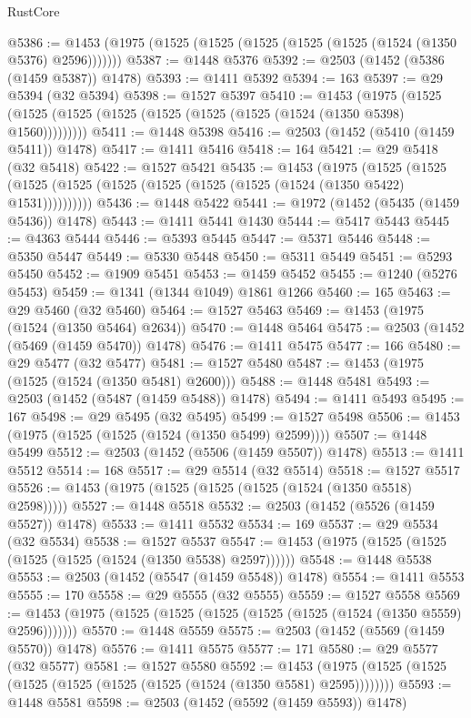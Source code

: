 \begin{lexlean}{RustCore}
\begin{coremodule}
@5386 := @1453 (@1975 (@1525 (@1525 (@1525 (@1525 (@1525 (@1524 (@1350 @5376) @2596)))))))
@5387 := @1448 @5376
@5392 := @2503 (@1452 (@5386 (@1459 @5387)) @1478)
@5393 := @1411 @5392
@5394 := 163
@5397 := @29 @5394 (@32 @5394)
@5398 := @1527 @5397
@5410 := @1453
    (@1975 (@1525 (@1525 (@1525 (@1525 (@1525 (@1525 (@1525 (@1524 (@1350 @5398) @1560)))))))))
@5411 := @1448 @5398
@5416 := @2503 (@1452 (@5410 (@1459 @5411)) @1478)
@5417 := @1411 @5416
@5418 := 164
@5421 := @29 @5418 (@32 @5418)
@5422 := @1527 @5421
@5435 := @1453
    (@1975
      (@1525 (@1525 (@1525 (@1525 (@1525 (@1525 (@1525 (@1525 (@1524 (@1350 @5422) @1531))))))))))
@5436 := @1448 @5422
@5441 := @1972 (@1452 (@5435 (@1459 @5436)) @1478)
@5443 := @1411 @5441 @1430
@5444 := @5417 @5443
@5445 := @4363 @5444
@5446 := @5393 @5445
@5447 := @5371 @5446
@5448 := @5350 @5447
@5449 := @5330 @5448
@5450 := @5311 @5449
@5451 := @5293 @5450
@5452 := @1909 @5451
@5453 := @1459 @5452
@5455 := @1240 (@5276 @5453)
@5459 := @1341 (@1344 @1049) @1861 @1266
@5460 := 165
@5463 := @29 @5460 (@32 @5460)
@5464 := @1527 @5463
@5469 := @1453 (@1975 (@1524 (@1350 @5464) @2634))
@5470 := @1448 @5464
@5475 := @2503 (@1452 (@5469 (@1459 @5470)) @1478)
@5476 := @1411 @5475
@5477 := 166
@5480 := @29 @5477 (@32 @5477)
@5481 := @1527 @5480
@5487 := @1453 (@1975 (@1525 (@1524 (@1350 @5481) @2600)))
@5488 := @1448 @5481
@5493 := @2503 (@1452 (@5487 (@1459 @5488)) @1478)
@5494 := @1411 @5493
@5495 := 167
@5498 := @29 @5495 (@32 @5495)
@5499 := @1527 @5498
@5506 := @1453 (@1975 (@1525 (@1525 (@1524 (@1350 @5499) @2599))))
@5507 := @1448 @5499
@5512 := @2503 (@1452 (@5506 (@1459 @5507)) @1478)
@5513 := @1411 @5512
@5514 := 168
@5517 := @29 @5514 (@32 @5514)
@5518 := @1527 @5517
@5526 := @1453 (@1975 (@1525 (@1525 (@1525 (@1524 (@1350 @5518) @2598)))))
@5527 := @1448 @5518
@5532 := @2503 (@1452 (@5526 (@1459 @5527)) @1478)
@5533 := @1411 @5532
@5534 := 169
@5537 := @29 @5534 (@32 @5534)
@5538 := @1527 @5537
@5547 := @1453 (@1975 (@1525 (@1525 (@1525 (@1525 (@1524 (@1350 @5538) @2597))))))
@5548 := @1448 @5538
@5553 := @2503 (@1452 (@5547 (@1459 @5548)) @1478)
@5554 := @1411 @5553
@5555 := 170
@5558 := @29 @5555 (@32 @5555)
@5559 := @1527 @5558
@5569 := @1453 (@1975 (@1525 (@1525 (@1525 (@1525 (@1525 (@1524 (@1350 @5559) @2596)))))))
@5570 := @1448 @5559
@5575 := @2503 (@1452 (@5569 (@1459 @5570)) @1478)
@5576 := @1411 @5575
@5577 := 171
@5580 := @29 @5577 (@32 @5577)
@5581 := @1527 @5580
@5592 := @1453 (@1975 (@1525 (@1525 (@1525 (@1525 (@1525 (@1525 (@1524 (@1350 @5581) @2595))))))))
@5593 := @1448 @5581
@5598 := @2503 (@1452 (@5592 (@1459 @5593)) @1478)

\end{coremodule}
\end{lexlean}
